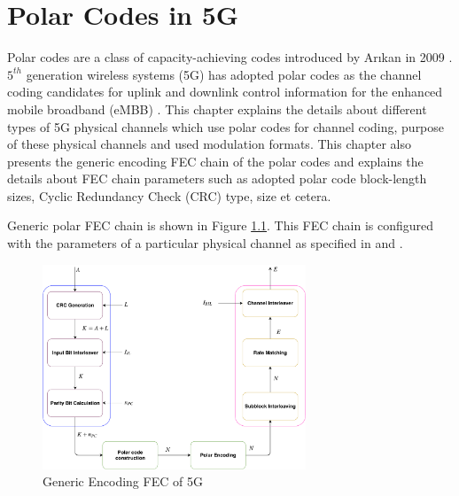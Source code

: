 \chapter{Polar Codes in 5G} \label{polarCodes}
Polar codes are a class of capacity-achieving codes introduced by Ar\i kan in 2009 \cite{Arikan}. $ 5^{th} $ generation wireless systems (5G) has adopted polar codes as the channel coding candidates for uplink and downlink control information for the enhanced mobile broadband (eMBB) \cite{3gpp.38.212}. This chapter explains the details about different types of 5G physical channels which use polar codes for channel coding, purpose of these physical channels and used modulation formats. This chapter also presents the generic encoding FEC chain of the polar codes and explains the details about FEC chain parameters such as adopted polar code block-length sizes, Cyclic Redundancy Check (CRC) type, size et cetera.

Generic polar FEC chain is shown in Figure \ref{fig:Generic5gtx_fec_chain}. This FEC chain is configured with the parameters of a particular physical channel as specified in \cite{3gpp.38.212} and \cite{3gpp.38.211}.

\begin{figure}[!h]
	\centering
	\includegraphics[width=0.7\textwidth]{./figures/Generic5GFECchain.pdf}
	\caption{Generic Encoding FEC of 5G}
	\label{fig:Generic5gtx_fec_chain}
\end{figure}

